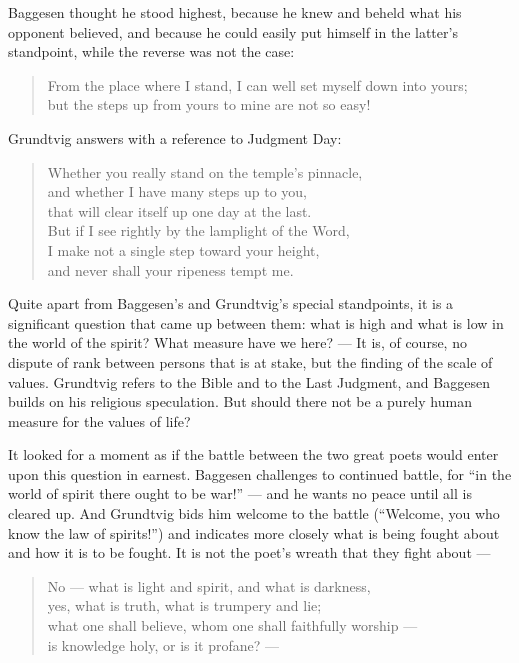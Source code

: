 \documentclass[12pt,a4paper]{book}
\newcommand{\opage}[1]{\marginnote{\footnotesize\textit{[#1]}}}
\begin{document}
Baggesen thought he stood highest, because he knew and beheld what his opponent
believed, and because he could easily put himself in the latter's standpoint, while the
reverse was not the case:

\begin{verse}
From the place where I stand, I can well set myself down into yours;\\
but the steps up from yours to mine are not so easy!
\end{verse}

Grundtvig answers with a reference to Judgment Day:

\begin{verse}
Whether you really stand on the temple's pinnacle,\\
and whether I have many steps up to you,\\
that will clear itself up one day at the last.\\
\opage{71}But if I see rightly by the lamplight of the Word,\\
I make not a single step toward your height,\\
and never shall your ripeness tempt me.
\end{verse}

Quite apart from Baggesen's and Grundtvig's special standpoints, it is a significant
question that came up between them: what is high and what is low in the world of the
spirit? What measure have we here? --- It is, of course, no dispute of rank between
persons that is at stake, but the finding of the scale of values. Grundtvig refers to
the Bible and to the Last Judgment, and Baggesen builds on his religious speculation.
But should there not be a purely human measure for the values of life?

It looked for a moment as if the battle between the two great poets would enter upon
this question in earnest. Baggesen challenges to continued battle, for ``in the world
of spirit there ought to be war!'' --- and he wants no peace until all is cleared up.
And Grundtvig bids him welcome to the battle (``Welcome, you who know the law of
spirits!'') and indicates more closely what is being fought about and how it is to be
fought. It is not the poet's wreath that they fight about ---

\begin{verse}
No --- what is light and spirit, and what is darkness,\\
yes, what is truth, what is trumpery and lie;\\
what one shall believe, whom one shall faithfully worship ---\\
is knowledge holy, or is it profane? ---
\end{verse}
\end{document}

